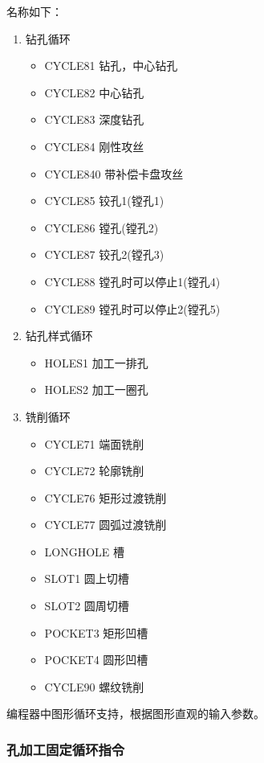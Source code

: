 名称如下：

\begin{enumerate}
	\item 钻孔循环 
\begin{itemize}
\item 	CYCLE81    钻孔，中心钻孔 
\item CYCLE82    中心钻孔 
\item CYCLE83    深度钻孔 
\item CYCLE84    刚性攻丝 
\item CYCLE840   带补偿卡盘攻丝 
\item CYCLE85    铰孔1(镗孔1) 
\item CYCLE86    镗孔(镗孔2) 
\item CYCLE87    铰孔2(镗孔3) 
\item CYCLE88    镗孔时可以停止1(镗孔4) 
\item CYCLE89    镗孔时可以停止2(镗孔5)

\end{itemize}
\vspace{10pt}

\item 钻孔样式循环  
\begin{itemize}
	\item HOLES1    加工一排孔 
\item HOLES2    加工一圈孔  
\end{itemize}
\vspace{10pt}
\item 铣削循环 
\begin{itemize}
	\item CYCLE71    端面铣削 
\item CYCLE72    轮廓铣削 
\item CYCLE76    矩形过渡铣削 
\item CYCLE77    圆弧过渡铣削 
\item LONGHOLE   槽 
\item SLOT1    圆上切槽 
\item SLOT2    圆周切槽 
\item POCKET3    矩形凹槽 
\item POCKET4    圆形凹槽 
\item CYCLE90    螺纹铣削
\end{itemize}

\end{enumerate}
\vspace{10pt}
编程器中图形循环支持，根据图形直观的输入参数。

\subsubsection{孔加工固定循环指令}


